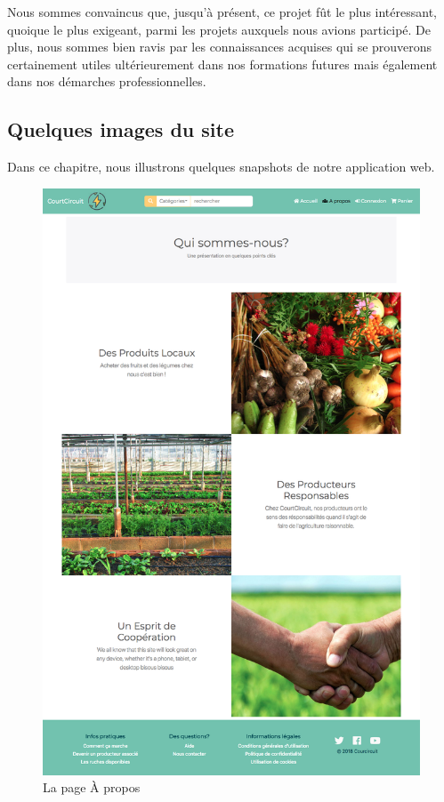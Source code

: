 \documentclass[a4paper,12pt]{report}
\theoremstyle{break}
\theoremstyle{break}
\theoremstyle{break}
\theoremstyle{break}
\theoremstyle{definition}
\theoremstyle{remark}
\begin{document}
Nous sommes convaincus que, jusqu'à présent, ce projet fût le plus intéressant, quoique le plus exigeant, parmi les projets auxquels nous avions participé. De plus, nous sommes bien ravis par les connaissances acquises qui se prouverons certainement utiles ultérieurement dans nos formations futures mais également dans nos démarches professionnelles.
\begin{appendices} 
\setcounter{page}{1}

\chapter{Quelques images du site} 
Dans ce chapitre, nous illustrons quelques snapshots de notre application web.

\begin{figure}[!ht]
  \centering
  \includegraphics[scale=0.23]{images/about.png}
  \caption{La page À propos}
\end{figure}


\end{appendices}
\end{document}
